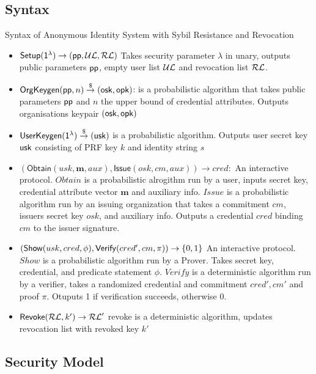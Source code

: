 \subsection{Syntax}
Syntax of Anonymous Identity System with Sybil Resistance and Revocation
\begin{itemize}
    \item $\mathsf{Setup}(\mathsf{1^{\lambda}}) \to (\mathsf{pp}, \mathcal{UL}, \mathcal{RL})$ Takes security parameter $\lambda$ in unary, outputs public parameters $\mathsf{pp}$, empty user list $\mathcal{UL}$ and revocation list $\mathcal{RL}$.

    \item $\mathsf{OrgKeygen}(\mathsf{pp}, n) \stackrel{\$}{\to} (\mathsf{osk}, \mathsf{opk})$: is a probabilistic algorithm that takes public parameters $\mathsf{pp}$ and $n$ the upper bound of credential attributes. Outputs organisations keypair $(\mathsf{osk}, \mathsf{opk})$

    \item $\mathsf{UserKeygen}(\mathsf{1^{\lambda}}) \stackrel{\$}{\to} (\mathsf{usk})$ is a probabilistic algorithm. Outputs user secret key $\mathsf{usk}$ consisting of PRF key $k$ and identity string $s$

    \item $(\mathsf{Obtain}(usk, \textbf{m}, aux), \mathsf{Issue}(osk, cm, aux)) \to cred:$ An interactive protocol. $Obtain$ is a probabilistic alrogithm run by a user, inputs secret key, credential attribute vector $\textbf{m}$ and auxiliary info. $Issue$ is a probabilistic algorithm run by an issuing organization that takes a commitment $cm$, issuers secret key $osk$, and auxiliary info. Outputs a credential $cred$ binding $cm$ to the issuer signature.

    \item $(\mathsf{Show}(usk, cred, \phi), \mathsf{Verify}(cred', cm, \pi)) \to \{0,1\}$ An interactive protocol. $Show$ is a probabilistic algorithm run by a Prover. Takes secret key, credential, and predicate statement $\phi$. $Verify$ is a deterministic algorithm run by a verifier, takes a randomized credential and commitment $cred', cm'$ and proof $\pi$. Otuputs 1 if verification succeeds, otherwise 0.

    \item $\mathsf{Revoke}(\mathcal{RL}, k') \to \mathcal{RL}'$ revoke is a deterministic algorithm, updates revocation list with revoked key $k'$
\end{itemize}


\subsection{Security Model}

